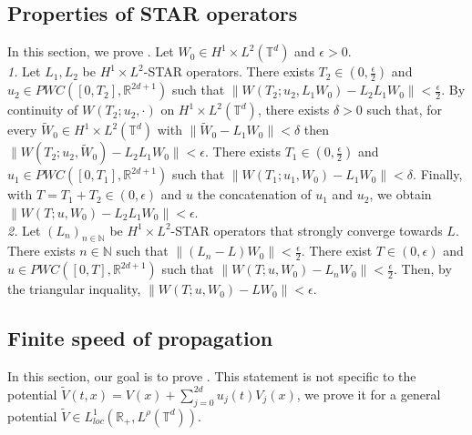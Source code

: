 \documentclass[a4paper]{article}
\theoremstyle{plain}
\newcommand{\T}{\mathbb{T}}
\newcommand{\R}{\mathbb{R}}
\begin{document}
\subsection{Properties of STAR operators} \label{Appendix:STAR}

In this section, we prove . Let $W_0 \in H^1 \times L^2(\T^d)$ and $\epsilon>0$.
\\

\noindent \emph{1.} Let $L_1, L_2$ be $H^1 \times L^2$-STAR operators. There exists $T_2 \in (0,\frac{\epsilon}{2})$ and $u_2 \in PWC([0,T_2],\R^{2d+1})$ such that $\| W(T_2;u_2, L_1 W_0)-L_2 L_1 W_0 \|<\frac{\epsilon}{2}$. By continuity of $W(T_2;u_2, \cdot)$ on $H^1 \times L^2(\T^d)$, there exists $\delta>0$ such that, for every $\widetilde{W}_0 \in H^1 \times L^2(\T^d)$ with $\|\widetilde{W}_0-L_1 W_0\|<\delta$ then $\| W(T_2;u_2,\widetilde{W}_0)-L_2 L_1 W_0 \|<\epsilon$. There exists $T_1 \in (0,\frac{\epsilon}{2})$ and $u_1 \in PWC([0,T_1],\R^{2d+1})$ such that $\| W(T_1;u_1, W_0)-L_1 W_0 \|<\delta$. Finally, with $T=T_1+T_2 \in (0,\epsilon)$ and $u$ the concatenation of $u_1$ and $u_2$, we obtain
$\|W(T;u,W_0)-L_2 L_1 W_0 \|<\epsilon$.
\\


\noindent \emph{2.} Let $(L_n)_{n\in\mathbb{N}}$ be $H^1 \times L^2$-STAR operators that strongly converge towards $L$. There exists $n \in \mathbb{N}$
such that $\|(L_n-L)W_0\|<\frac{\epsilon}{2}$. There exist $T \in (0,\epsilon)$ and $u \in PWC([0,T],\R^{2d+1})$ such that $\|W(T;u,W_0)-L_n W_0\|<\frac{\epsilon}{2}$. Then, by the triangular inquality, $\|W(T;u,W_0)-L W_0\|<\epsilon$.
    



\subsection{Finite speed of propagation} \label{sec:propagation}



In this section, our goal is to prove . 
This statement is not specific to the potential $\widetilde{V}(t,x)=V(x)+\sum_{j=0}^{2d} u_j(t) V_j(x)$, we prove it for a general potential  $\widetilde{V} \in L^{1}_{loc}(\R_+,L^{\rho}(\T^d))$.

\medskip
\end{document}

